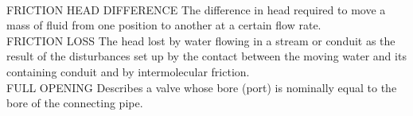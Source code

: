 \vspace{0.3cm}\\
FRICTION HEAD DIFFERENCE
The difference in head required to move a mass of fluid from one position to another at a certain flow rate.
\vspace{0.3cm}\\
FRICTION LOSS
The head lost by water flowing in a stream or conduit as the result of the disturbances set up by the contact between the moving water and its containing conduit and by intermolecular friction. 
\vspace{0.3cm}\\
FULL OPENING
Describes a valve whose bore (port) is nominally equal to the bore of the connecting pipe.
\vspace{0.3cm}\\

